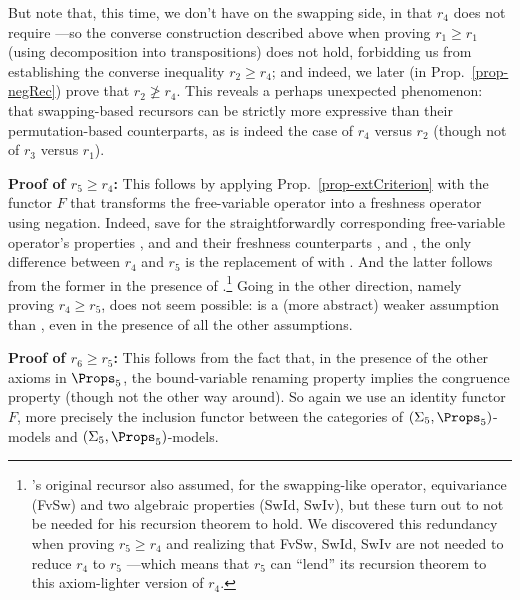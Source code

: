 	But note that, this time, we don't have \SwCp{} on the swapping side, in that $r_4$ does not require \SwCp{}---so the converse construction described above when proving $r_1\geq r_1$ (using decomposition into transpositions) does not hold, forbidding us from establishing the converse inequality $r_2 \geq r_4$; and indeed, we later (in  Prop.~\ref{prop-negRec}) prove that $r_2 \not\geq r_4$.  
	This reveals a perhaps unexpected phenomenon: that swapping-based recursors can be strictly more expressive than their permutation-based counterparts, as is indeed the case of $r_4$ versus $r_2$ (though not of $r_3$ versus $r_1$). 
	
	\textbf{Proof of $r_5 \geq r_4$:} This follows by applying 
	Prop.~\ref{prop-extCriterion} with the functor $F$ that transforms the 
	free-variable operator into a freshness operator using negation. Indeed, save for the straightforwardly corresponding free-variable operator's 
  properties \FvVr{}, \FvAp{} and \FvLm{} and their freshness counterparts 
	 \FrVr{}, \FrAp{} and \FrLm{}, 
	the only difference between $r_4$ and $r_5$ is the replacement of 
	\SwFv{} 
	with 
	\SwBvr{}.
	And the latter follows from the former in the presence of \FvLm{}.\footnote{\citet{primrecFOAS-Norrish04}'s original recursor also assumed, for the swapping-like operator, equivariance (\textsf{FvSw}) and two algebraic properties (\textsf{SwId}, \textsf{SwIv}), but these turn out to not be needed for his recursion theorem to hold. We discovered this redundancy when proving $r_5 \geq r_4$ and realizing that \textsf{FvSw}, \textsf{SwId}, \textsf{SwIv} are not needed to reduce $r_4$ to $r_5$%
		---which means that $r_5$ can ``lend'' its recursion theorem to this axiom-lighter version of  $r_4$.} 
	Going in the other direction, 
	namely proving $r_4 \geq r_5$, does not seem possible: \SwBvr{} is a (more abstract) weaker assumption than %
	\SwFv{}, 
	even in the presence of all the other assumptions. 
	
	\textbf{Proof of $r_6 \geq r_5$:} This follows from the fact that, in the presence of the other axioms in $\Props_5$, 
	the bound-variable renaming property \SwBvr{} implies the congruence property \SwCg{} (though not the other way around). So again we use an identity functor $F$, more precisely the inclusion functor between the categories 
	of $(\Sigma_5,\Props_5)$-models and $(\Sigma_5,\Props_5)$-models. 
	
